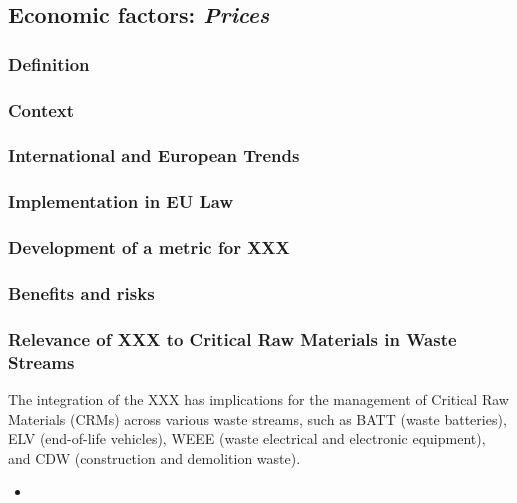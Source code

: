 \subsection{Economic factors: \textit{Prices}}

\subsubsection{Definition}

\subsubsection{Context}


\subsubsection{International and European Trends}

\subsubsection{Implementation in EU Law}


\subsubsection{Development of a metric for XXX}

\subsubsection{Benefits and risks}






\subsubsection{Relevance of XXX to Critical Raw Materials in Waste Streams}

The integration of the XXX has implications for the management of Critical Raw Materials
(CRMs) across various waste streams, such as BATT (waste batteries), ELV
(end-of-life vehicles), WEEE (waste electrical and electronic equipment), and
CDW (construction and demolition waste).

\wasteSubsubsecBATT
\begin{itemize}
    \item
\end{itemize}

